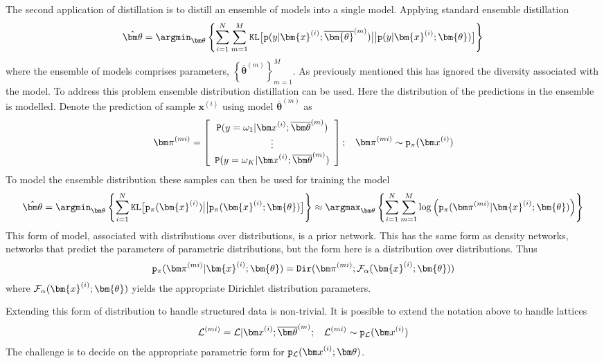 The second application of distillation is to distill an ensemble of models into a single model. Applying standard ensemble distillation
\begin{eqnarray}
{\hat{\bm\theta}} = \argmin_{\bm\theta}\left\{
\sum_{i=1}^N\sum_{m=1}^M{\tt KL}\big[
{\tt p}(y|\bm{x}^{(i)}; {\overline{\bm{\theta}}}^{(m)})
\big|\big|
{\tt p}(y|\bm{x}^{(i)}; {\bm{\theta}})
\big]
\right\}
\end{eqnarray}
where the ensemble of models comprises parameters, $\left\{{\overline{\bm\theta}}^{(m)}\right\}_{m=1}^M$.  As previously mentioned this has ignored the diversity associated with the model. To address this problem ensemble distribution distillation can be used. Here the distribution of the predictions in the ensemble is modelled. Denote the prediction of sample ${\bm x}^{(i)}$ using model ${\overline{\bm\theta}}^{(m)}$ as
\begin{eqnarray}
{\bm\pi}^{(mi)} = \left[
\begin{array}{c}
{\tt P}(y=\omega_1|{\bm x}^{(i)};{\overline{\bm\theta}}^{(m)}) \\
\vdots\\
{\tt P}(y=\omega_K|{\bm x}^{(i)};{\overline{\bm\theta}}^{(m)}) 
\end{array}
\right]; 
\:\:\:\:
{\bm\pi}^{(mi)} \sim {\tt p}_{\pi}({\bm x}^{(i)})
\end{eqnarray}
To model the ensemble distribution these samples can then be used for training the model
\begin{eqnarray}
{\hat{\bm\theta}} = 
\argmin_{\bm\theta}\left\{
\sum_{i=1}^N
{\tt KL}\big[
{\tt p}_{\pi}(\bm{x}^{(i)})
\big|\big|
{\tt p}_{\pi}(\bm{x}^{(i)}; {\bm{\theta}})
\big]
\right\}
\approx
\argmax_{\bm\theta}\left\{
\sum_{i=1}^N
\sum_{m=1}^M
\log\left(
{\tt p}_{\pi}({\bm\pi}^{(mi)} | \bm{x}^{(i)}; {\bm{\theta}})
\right)
\right\}
\end{eqnarray}
This form of model, associated with distributions over distributions, is a prior network. This has the same form as density networks, networks that predict the parameters of parametric distributions, but the form here is a distribution over distributions. Thus
\begin{eqnarray*}
{\tt p}_{\pi}({\bm\pi}^{(mi)} | \bm{x}^{(i)}; {\bm{\theta}})
= {\tt Dir}({\bm\pi}^{(mi)}; {\cal F}_\alpha(\bm{x}^{(i)}; {\bm{\theta}}))
\end{eqnarray*}
where ${\cal F}_\alpha(\bm{x}^{(i)}; {\bm{\theta}})$ yields the appropriate Dirichlet distribution parameters.

Extending this form of distribution to handle structured data is non-trivial. It is possible to extend the notation above to handle lattices
\begin{eqnarray}
{\cal L}^{(mi)} = 
{\cal L}|{\bm x}^{(i)};{\overline{\bm\theta}}^{(m)};
\:\:\:\:
{\cal L}^{(mi)} \sim {\tt p}_{\cal L}({\bm x}^{(i)})
\end{eqnarray}
The challenge is to decide on the appropriate parametric form for ${\tt p}_{\cal L}({\bm x}^{(i)};{\bm\theta})$.

